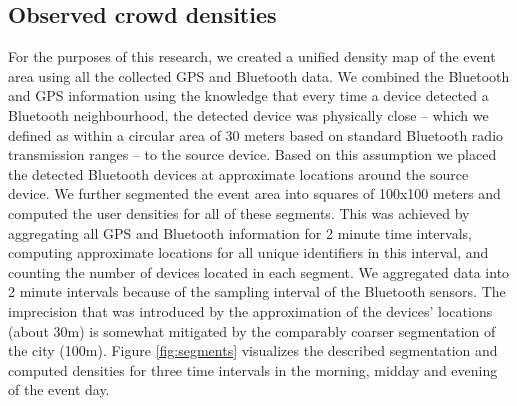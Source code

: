 \documentclass[12pt,a4paper,twoside,openright]{book}
\begin{document}
\subsection{Observed crowd densities}
\label{subsec:observed-densities}

For the purposes of this research, we created a unified density map of the event area using all the collected GPS and Bluetooth data.
%
We combined the Bluetooth and GPS information using the knowledge that every time a device detected a Bluetooth neighbourhood, the detected device was physically close -- which we defined as within a circular area of 30 meters based on standard Bluetooth radio transmission ranges -- to the source device.
%
Based on this assumption we placed the detected Bluetooth devices at approximate locations around the source device.
%
We further segmented the event area into squares of 100x100 meters and computed the user densities for all of these segments.
%
This was achieved by aggregating all GPS and Bluetooth information for 2 minute time intervals, computing approximate locations for all unique identifiers in this interval, and counting the number of devices located in each segment.
%
We aggregated data into 2 minute intervals because of the sampling interval of the Bluetooth sensors.
%
The imprecision that was introduced by the approximation of the devices' locations (about 30m) is somewhat mitigated by the comparably coarser segmentation of the city (100m).
%
Figure \ref{fig:segments} visualizes the described segmentation and computed densities for three time intervals in the morning, midday and evening of the event day.
\end{document}
